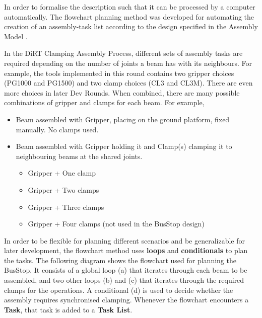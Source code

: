 In order to formalise the description such that it can be processed by a computer automatically. The flowchart planning method was developed for automating the creation of an assembly-task list according to the design specified in the Assembly Model \parencite{huangNewAnalogProtocol2021}.

In the DiRT Clamping Assembly Process, different sets of assembly tasks are required depending on the number of joints a beam has with its neighbours. For example, the tools implemented in this round contains two gripper choices (PG1000 and PG1500) and two clamp choices (CL3 and CL3M). There are even more choices in later Dev Rounds. When combined, there are many possible combinations of gripper and clamps for each beam. For example,

\begin{itemize}
	\item Beam assembled with Gripper, placing on the ground platform, fixed manually. No clamps used.

	\item Beam assembled with Gripper holding it and Clamp(s) clamping it to neighbouring beams at the shared joints.

\begin{itemize}
	\item Gripper + One clamp

	\item Gripper + Two clamps

	\item Gripper + Three clamps

	\item Gripper + Four clamps (not used in the BusStop design)

\end{itemize}
\end{itemize}
In order to be flexible for planning different scenarios and be generalizable for later development, the flowchart method uses \textbf{loops }and \textbf{conditionals }to plan the tasks. The following diagram shows the flowchart used for planning the BusStop. It consists of a global loop (a) that iterates through each beam to be assembled, and two other loops (b) and (c) that iterates through the required clamps for the operations. A conditional (d) is used to decide whether the assembly requires synchronised clamping. Whenever the flowchart encounters a \textbf{Task}, that task is added to a \textbf{Task List}. 




